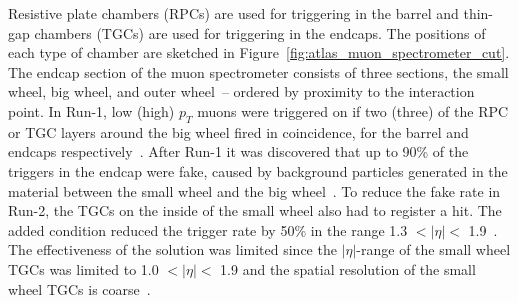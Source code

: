 Resistive plate chambers (RPCs) are used for triggering in the barrel and thin-gap chambers (TGCs) are used for triggering in the endcaps. The positions of each type of chamber are sketched in Figure~\ref{fig:atlas_muon_spectrometer_cut}. The endcap section of the muon spectrometer consists of three sections, the small wheel, big wheel, and outer wheel~-- ordered by proximity to the interaction point. In Run-1, low (high) $p_T$ muons were triggered on if two (three) of the RPC or TGC layers around the big wheel fired in coincidence, for the barrel and endcaps respectively~\cite{atlas_l1_trigger_tdr}. After Run-1 it was discovered that up to 90\% of the triggers in the endcap were fake, caused by background particles generated in the material between the small wheel and the big wheel~\cite{nsw_tdr}.  To reduce the fake rate in Run-2, the TGCs on the inside of the small wheel also had to register a hit. The added condition reduced the trigger rate by 50\% in the range 1.3 $< |\eta| <$ 1.9~\cite{martinez_run-2_2016}. The effectiveness of the solution was limited since the $|\eta|$-range of the small wheel TGCs was limited to 1.0 $< |\eta| <$ 1.9 and the spatial resolution of the small wheel TGCs is coarse~\cite{nsw_tdr}.


